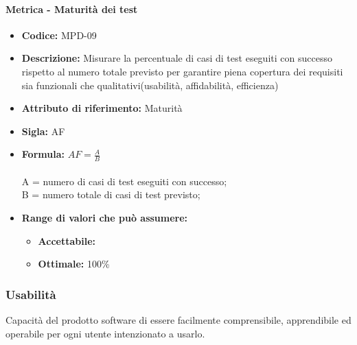        
                  \paragraph{Metrica - Maturità dei test} 
            \begin{itemize}
           \item   \textbf{Codice:} MPD-09
            \item  \textbf{Descrizione:} Misurare la percentuale di casi di test eseguiti con successo rispetto al numero totale previsto per garantire piena copertura dei requisiti sia funzionali che qualitativi(usabilità, affidabilità, efficienza)
              \item   \textbf{Attributo di riferimento:} Maturità
          \item    \textbf{Sigla:} AF
           \item   \textbf{Formula:} \begin{math}AF = \frac{A}{B}\end{math}\\ \\
            A = numero di casi di test eseguiti con successo;\\
            B = numero totale di casi di test previsto;
            \item \textbf{Range di valori che può assumere:}
        \begin{itemize}
            \item \textbf{Accettabile:} 
            \item \textbf{Ottimale:} 100\%
        \end{itemize}
       \end{itemize}
       
              \subsubsection{Usabilità}
   Capacità del prodotto software di essere facilmente comprensibile, apprendibile ed operabile per ogni utente intenzionato a usarlo.
   

